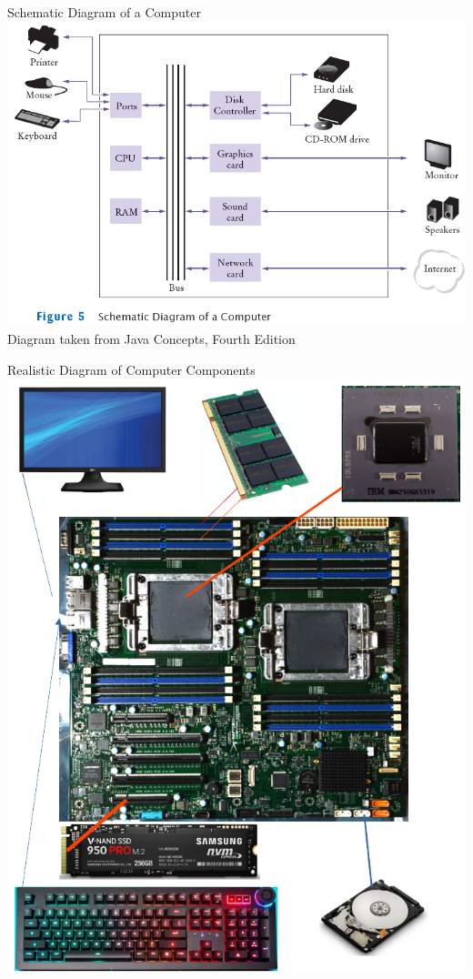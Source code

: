 \documentclass[graphics]{beamer}
\begin{document}
\begin{frame}{Schematic Diagram of a Computer}
    \centering
    \includegraphics[scale=0.6]{L02_ArchNumbersSystems/L2_p7.png}
    \footnotesize{Diagram taken from Java Concepts, Fourth Edition}
\end{frame}

\begin{frame}{Realistic Diagram of Computer Components}
\centering
    \includegraphics[scale=0.25]{L02_ArchNumbersSystems/L2_p8.png}
\end{frame}
\end{document}
